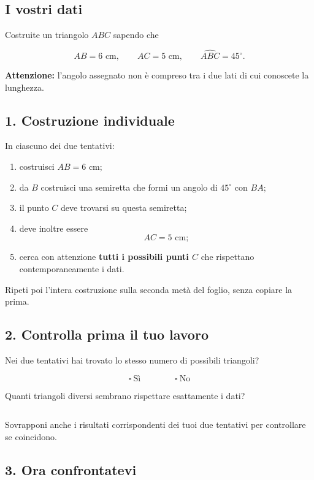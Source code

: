 \documentclass[10pt,a4paper]{article}
\begin{document}
\subsection*{I vostri dati}

Costruite un triangolo \(ABC\) sapendo che

\[
AB=6\text{ cm},
\qquad
AC=5\text{ cm},
\qquad
\widehat{ABC}=45^\circ.
\]

\textbf{Attenzione:} l'angolo assegnato non è compreso
tra i due lati di cui conoscete la lunghezza.

\subsection*{1. Costruzione individuale}

In ciascuno dei due tentativi:

\begin{enumerate}
	\item costruisci \(AB=6\) cm;
	\item da \(B\) costruisci una semiretta che formi un angolo
	di \(45^\circ\) con \(BA\);
	\item il punto \(C\) deve trovarsi su questa semiretta;
	\item deve inoltre essere
	\[
	AC=5\text{ cm};
	\]
	\item cerca con attenzione \textbf{tutti i possibili punti \(C\)}
	che rispettano contemporaneamente i dati.
\end{enumerate}

Ripeti poi l'intera costruzione sulla seconda metà del foglio,
senza copiare la prima.

\subsection*{2. Controlla prima il tuo lavoro}

Nei due tentativi hai trovato lo stesso numero di possibili triangoli?

\[
\square\ \text{Sì}
\qquad\qquad
\square\ \text{No}
\]

Quanti triangoli diversi sembrano rispettare esattamente i dati?

\[
\boxed{\hspace{2cm}}
\]

Sovrapponi anche i risultati corrispondenti dei tuoi due tentativi
per controllare se coincidono.

\subsection*{3. Ora confrontatevi}
\end{document}
